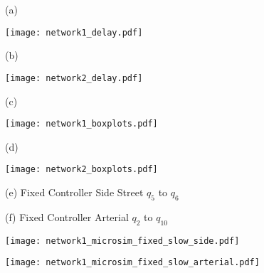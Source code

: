 \begin{figure*}[t!]
%
\centering
%
%
\vspace{-5mm}
\begin{subfigure}{0.49\textwidth}
  \footnotesize{(a)}
  
\texttt{[image: network1\_delay.pdf]}
 \label{fig:arterial:delayCurve}
\end{subfigure}
\begin{subfigure}{0.49\textwidth}
  \footnotesize{(b)}
  
\texttt{[image: network2\_delay.pdf]}
 \label{fig:grid:delayCurve}
\end{subfigure}
\begin{subfigure}{0.49\textwidth}
  \footnotesize{(c)}
  
\texttt{[image: network1\_boxplots.pdf]}
 \label{fig:arterial:boxplot}
\end{subfigure}
\begin{subfigure}{0.49\textwidth}
  \footnotesize{(d)}  
  
\texttt{[image: network2\_boxplots.pdf]}
 \label{fig:grid:boxplot}
\end{subfigure}
\begin{subfigure}{0.49\textwidth}
  \centering
  \footnotesize{(e) Fixed Controller Side Street $q_5$ to $q_6$}
\end{subfigure}
\begin{subfigure}{0.49\textwidth}
  \centering
  \footnotesize{(f) Fixed Controller Arterial $q_2$ to $q_{10}$}
\end{subfigure}
%
\begin{subfigure}{0.49\textwidth}
\texttt{[image: network1\_microsim\_fixed\_slow\_side.pdf]}
 \label{fig:microsim1:fixed:side}
\end{subfigure}
\begin{subfigure}{0.49\textwidth}
\texttt{[image: network1\_microsim\_fixed\_slow\_arterial.pdf]}
 \label{fig:microsim1:fixed:arterial}
\end{subfigure}


\end{figure*}
